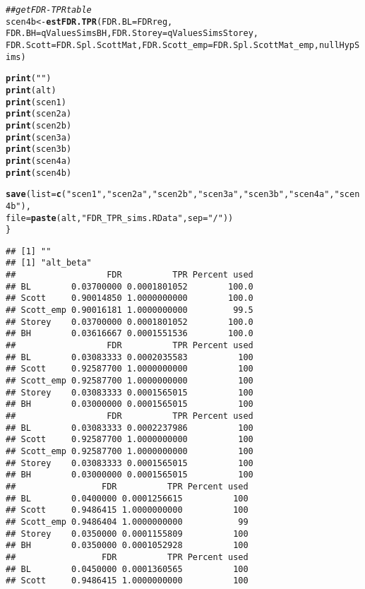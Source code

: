 \documentclass{article}\usepackage[]{graphicx}\usepackage[]{color}
\makeatletter
\newcommand{\hlstr}[1]{\textcolor[rgb]{0.192,0.494,0.8}{#1}}%
\newcommand{\hlcom}[1]{\textcolor[rgb]{0.678,0.584,0.686}{\textit{#1}}}%
\newcommand{\hlstd}[1]{\textcolor[rgb]{0.345,0.345,0.345}{#1}}%
\newcommand{\hlkwb}[1]{\textcolor[rgb]{0.69,0.353,0.396}{#1}}%
\newcommand{\hlkwc}[1]{\textcolor[rgb]{0.333,0.667,0.333}{#1}}%
\newcommand{\hlkwd}[1]{\textcolor[rgb]{0.737,0.353,0.396}{\textbf{#1}}}%
\newenvironment{kframe}{%
 \def\at@end@of@kframe{}%
 \ifinner\ifhmode%
  \def\at@end@of@kframe{\end{minipage}}%
  \begin{minipage}{\columnwidth}%
 \fi\fi%
 \def\FrameCommand##1{\hskip\@totalleftmargin \hskip-\fboxsep
 \colorbox{shadecolor}{##1}\hskip-\fboxsep
     \hskip-\linewidth \hskip-\@totalleftmargin \hskip\columnwidth}%
 \MakeFramed {\advance\hsize-\width
   \@totalleftmargin\z@ \linewidth\hsize
   \@setminipage}}%
 {\par\unskip\endMakeFramed%
 \at@end@of@kframe}
\newenvironment{knitrout}{}{} %
\makeatother
\begin{document}
\begin{knitrout}
\begin{kframe}
\begin{alltt}
  \hlcom{##get FDR-TPR table}
  \hlstd{scen4b} \hlkwb{<-} \hlkwd{estFDR.TPR}\hlstd{(}\hlkwc{FDR.BL} \hlstd{= FDRreg,}
                       \hlkwc{FDR.BH} \hlstd{= qValuesSimsBH,} \hlkwc{FDR.Storey} \hlstd{= qValuesSimsStorey,}
                       \hlkwc{FDR.Scott} \hlstd{= FDR.Spl.ScottMat,} \hlkwc{FDR.Scott_emp} \hlstd{= FDR.Spl.ScottMat_emp, nullHypSims)}

  \hlkwd{print}\hlstd{(}\hlstr{""}\hlstd{)}
  \hlkwd{print}\hlstd{(alt)}
  \hlkwd{print}\hlstd{(scen1)}
  \hlkwd{print}\hlstd{(scen2a)}
  \hlkwd{print}\hlstd{(scen2b)}
  \hlkwd{print}\hlstd{(scen3a)}
  \hlkwd{print}\hlstd{(scen3b)}
  \hlkwd{print}\hlstd{(scen4a)}
  \hlkwd{print}\hlstd{(scen4b)}

  \hlkwd{save}\hlstd{(}\hlkwc{list}\hlstd{=}\hlkwd{c}\hlstd{(}\hlstr{"scen1"}\hlstd{,}\hlstr{"scen2a"}\hlstd{,}\hlstr{"scen2b"}\hlstd{,}\hlstr{"scen3a"}\hlstd{,}\hlstr{"scen3b"}\hlstd{,}\hlstr{"scen4a"}\hlstd{,}\hlstr{"scen4b"}\hlstd{),}
       \hlkwc{file}\hlstd{=}\hlkwd{paste}\hlstd{(alt,}\hlstr{"FDR_TPR_sims.RData"}\hlstd{,}\hlkwc{sep}\hlstd{=}\hlstr{"/"}\hlstd{))}
\hlstd{\}}
\end{alltt}
\begin{verbatim}
## [1] ""
## [1] "alt_beta"
##                  FDR          TPR Percent used
## BL        0.03700000 0.0001801052        100.0
## Scott     0.90014850 1.0000000000        100.0
## Scott_emp 0.90016181 1.0000000000         99.5
## Storey    0.03700000 0.0001801052        100.0
## BH        0.03616667 0.0001551536        100.0
##                  FDR          TPR Percent used
## BL        0.03083333 0.0002035583          100
## Scott     0.92587700 1.0000000000          100
## Scott_emp 0.92587700 1.0000000000          100
## Storey    0.03083333 0.0001565015          100
## BH        0.03000000 0.0001565015          100
##                  FDR          TPR Percent used
## BL        0.03083333 0.0002237986          100
## Scott     0.92587700 1.0000000000          100
## Scott_emp 0.92587700 1.0000000000          100
## Storey    0.03083333 0.0001565015          100
## BH        0.03000000 0.0001565015          100
##                 FDR          TPR Percent used
## BL        0.0400000 0.0001256615          100
## Scott     0.9486415 1.0000000000          100
## Scott_emp 0.9486404 1.0000000000           99
## Storey    0.0350000 0.0001155809          100
## BH        0.0350000 0.0001052928          100
##                 FDR          TPR Percent used
## BL        0.0450000 0.0001360565          100
## Scott     0.9486415 1.0000000000          100

\end{verbatim}
\end{kframe}
\end{knitrout}
\end{document}

